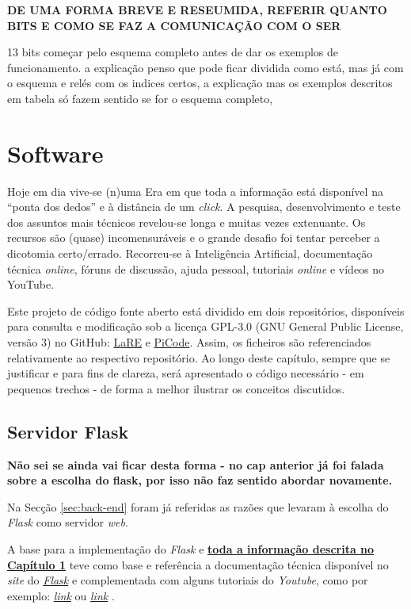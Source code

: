 \textbf{DE UMA FORMA BREVE E RESEUMIDA, REFERIR QUANTO BITS E COMO SE FAZ A COMUNICAÇÃO COM O SER}

13 bits começar pelo esquema completo antes de dar os exemplos de funcionamento. a explicação penso que pode ficar dividida como está, mas já com o esquema e relés com os indices certos, a explicação mas os exemplos descritos em tabela só fazem sentido se for o esquema completo,

\section{Software}
\label{sec:implementacaosoftware}
Hoje em dia vive-se (n)uma Era em que toda a informação está disponível na ``ponta dos dedos'' e à distância de um \textit{click}. A pesquisa, desenvolvimento e teste dos assuntos mais técnicos revelou-se longa e muitas vezes extenuante. Os recursos são (quase) incomensuráveis e o grande desafio foi tentar perceber a dicotomia certo/errado. Recorreu-se à Inteligência Artificial, documentação técnica \textit{online}, fóruns de discussão, ajuda pessoal, tutoriais \textit{online} e vídeos no YouTube.

Este projeto de código fonte aberto está dividido em dois repositórios, disponíveis para consulta e modificação sob a licença GPL-3.0 (GNU General Public License, versão 3) no GitHub: \href{https://github.com/eddygrinder/LaRE}{LaRE} e \href{https://github.com/eddygrinder/LaRE_PICode}{PiCode}. Assim, os ficheiros são referenciados relativamente ao respectivo repositório. Ao longo deste capítulo, sempre que se justificar e para fins de clareza, será apresentado o código necessário - em pequenos trechos - de forma a melhor ilustrar os conceitos discutidos.

\subsection{Servidor Flask}
\label{sec:flask}
\textbf{Não sei se ainda vai ficar desta forma - no cap anterior já foi falada sobre a escolha do flask, por isso não faz sentido abordar novamente.}

Na Secção \ref{sec:back-end} foram já referidas as razões que levaram à escolha do \textit{Flask} como servidor \textit{web}. 

A base para a implementação do \textit{Flask} e \underline{\textbf{toda a informação descrita no}} \underline{\textbf{Capítulo \ref{sec:implementacaosoftware}}} teve como base e referência a documentação técnica disponível no \textit{site} do \href{https://flask.palletsprojects.com/en/3.0.x/}{\textit{Flask}} e complementada com alguns tutoriais do \textit{Youtube}, como por exemplo: \href{https://www.youtube.com/watch?v=dam0GPOAvVI}{\textit{link}} ou \href{https://www.youtube.com/watch?v=bB6Yyh7nUl4}{\textit{link}} .

